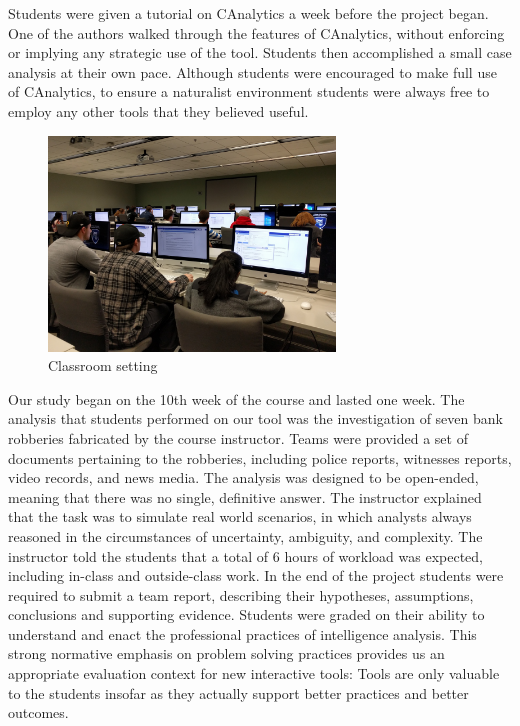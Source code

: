 Students were given a tutorial on CAnalytics a week before the project began.
One of the authors walked through the features of CAnalytics, without enforcing
or implying any strategic use of the tool. Students then accomplished a small
case analysis at their own pace. Although students were encouraged to make full
use of CAnalytics, to ensure a naturalist environment students were always free
to employ any other tools that they believed useful.

\begin{figure} \centering
\includegraphics[width=3in]{./img/classroom_setting.jpg} \caption{Classroom
setting}\label{fig:classroom} \end{figure}

Our study began on the 10th week of the course and lasted one week. The
analysis that students performed on our tool was the investigation of
seven bank robberies fabricated by the course instructor. Teams
were provided a set of documents pertaining to the robberies, including police
reports, witnesses reports, video records, and news media. The analysis was
designed to be open-ended, meaning that there was no single, definitive answer.
The instructor explained that the task was to simulate real world scenarios, in
which analysts always reasoned in the circumstances of uncertainty, ambiguity,
and complexity. The instructor told the students that a total of 6 hours of workload was expected, including in-class and outside-class work. In the end of
the project students were required to submit a team report, describing their
hypotheses, assumptions, conclusions and supporting evidence.
Students were graded on their ability to
understand and enact the professional practices of intelligence analysis. This
strong normative emphasis on problem solving practices provides us an
appropriate evaluation context for new interactive tools: Tools are only
valuable to the students insofar as they actually support better practices and
better outcomes.

